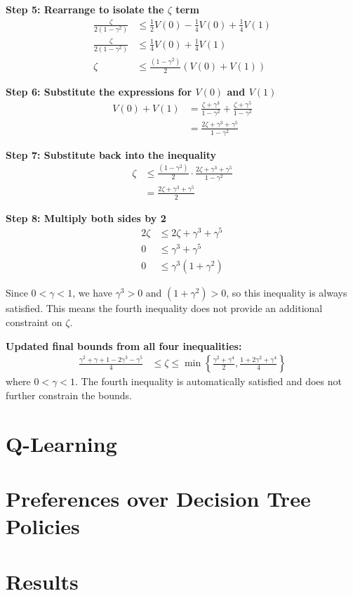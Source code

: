 \textbf{Step 5: Rearrange to isolate the $\zeta$ term}
\begin{align}
\frac{\zeta}{2(1-\gamma^2)} &\leq \frac{1}{2}V(0) - \frac{1}{4}V(0) + \frac{1}{4}V(1)\\
\frac{\zeta}{2(1-\gamma^2)} &\leq \frac{1}{4}V(0) + \frac{1}{4}V(1)\\
\zeta &\leq \frac{(1-\gamma^2)}{2}(V(0) + V(1))
\end{align}

\textbf{Step 6: Substitute the expressions for $V(0)$ and $V(1)$}
\begin{align}
V(0) + V(1) &= \frac{\zeta + \gamma^3}{1-\gamma^2} + \frac{\zeta + \gamma^5}{1-\gamma^2}\\
&= \frac{2\zeta + \gamma^3 + \gamma^5}{1-\gamma^2}
\end{align}

\textbf{Step 7: Substitute back into the inequality}
\begin{align}
\zeta &\leq \frac{(1-\gamma^2)}{2} \cdot \frac{2\zeta + \gamma^3 + \gamma^5}{1-\gamma^2}\\
&= \frac{2\zeta + \gamma^3 + \gamma^5}{2}
\end{align}

\textbf{Step 8: Multiply both sides by 2}
\begin{align}
2\zeta &\leq 2\zeta + \gamma^3 + \gamma^5\\
0 &\leq \gamma^3 + \gamma^5\\
0 &\leq \gamma^3(1 + \gamma^2)
\end{align}

Since $0 < \gamma < 1$, we have $\gamma^3 > 0$ and $(1 + \gamma^2) > 0$, so this inequality is always satisfied. This means the fourth inequality does not provide an additional constraint on $\zeta$.

\textbf{Updated final bounds from all four inequalities:}
\begin{align}
\frac{\gamma^2 + \gamma + 1 - 2\gamma^3 - \gamma^5}{4} &\leq \zeta \leq \min\left\{\frac{\gamma^2 + \gamma^4}{2}, \frac{1 + 2\gamma^2 + \gamma^4}{4}\right\}
\end{align}
where $0 < \gamma < 1$. The fourth inequality is automatically satisfied and does not further constrain the bounds.

\section{Q-Learning}
\section{Preferences over Decision Tree Policies}
\section{Results}